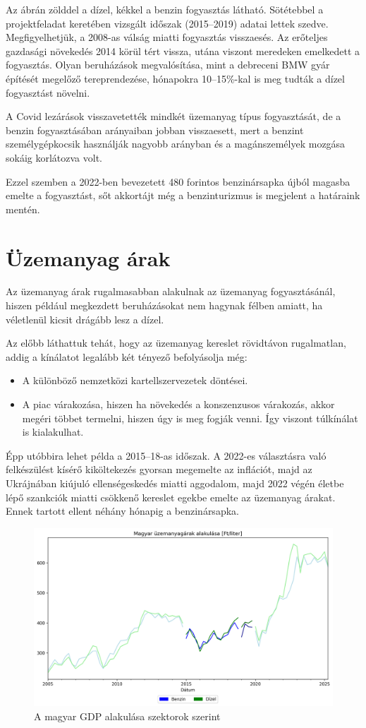 Az ábrán zölddel a dízel, kékkel a benzin fogyasztás látható. Sötétebbel a projektfeladat keretében
vizsgált időszak (2015--2019) adatai lettek szedve. Megfigyelhetjük, a 2008-as válság miatti
fogyasztás visszaesés. Az erőteljes gazdasági növekedés 2014 körül tért vissza, utána viszont
meredeken emelkedett a fogyasztás. Olyan beruházások megvalósítása, mint a debreceni BMW gyár
építését megelőző tereprendezése, hónapokra 10--15\%-kal is meg tudták a dízel fogyasztást növelni.

A Covid lezárások visszavetették mindkét üzemanyag típus fogyasztását, de a benzin fogyasztásában
arányaiban jobban visszaesett, mert a benzint személygépkocsik használják nagyobb arányban és a
magánszemélyek mozgása sokáig korlátozva volt.

Ezzel szemben a 2022-ben bevezetett 480 forintos benzinársapka újból magasba emelte a fogyasztást,
sőt akkortájt még a benzinturizmus is megjelent a határaink mentén.

\section{Üzemanyag árak}

Az üzemanyag árak rugalmasabban alakulnak az üzemanyag fogyasztásánál, hiszen például megkezdett
beruházásokat nem hagynak félben amiatt, ha véletlenül kicsit drágább lesz a dízel.

Az előbb láthattuk tehát, hogy az üzemanyag kereslet rövidtávon rugalmatlan, addig a kínálatot
legalább két tényező befolyásolja még:
\begin{itemize}
    \item A különböző nemzetközi kartellszervezetek döntései.
    \item A piac várakozása, hiszen ha növekedés a konszenzusos várakozás, akkor megéri többet termelni,
          hiszen úgy is meg fogják venni. Így viszont túlkínálat is kialakulhat.
\end{itemize}

Épp utóbbira lehet példa a 2015--18-as időszak. A 2022-es választásra való felkészülést kísérő
kiköltekezés gyorsan megemelte az inflációt, majd az Ukrájnában kiújuló ellenségeskedés miatti aggodalom,
majd 2022 végén életbe lépő szankciók miatti csökkenő kereslet egekbe emelte az üzemanyag árakat. Ennek tartott ellent néhány hónapig a benzinársapka.

\begin{figure}[htbp]
    \centering
    \includegraphics[width=1\textwidth, height=0.8\textheight, keepaspectratio]{../abrak/petrol_prices.png}
    \caption{A magyar GDP alakulása szektorok szerint}\label{fig:petrol_prices}
\end{figure}